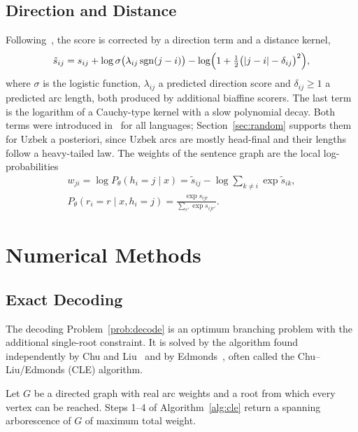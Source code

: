\documentclass[mathematics,article,submit,pdftex,oneauthor]{Definitions/mdpi}
\begin{document}
\subsection{Direction and Distance}
Following~\cite{Qi2018}, the score is corrected by a direction term and a distance kernel,
\begin{equation}\label{eq:corrected}
\tilde s_{ij}=s_{ij}+\log\sigma\bigl(\lambda_{ij}\,\mathrm{sgn}(j-i)\bigr)-\log\Bigl(1+\tfrac12\bigl(|j-i|-\delta_{ij}\bigr)^2\Bigr),
\end{equation}
where $\sigma$ is the logistic function, $\lambda_{ij}$ a predicted direction score and $\delta_{ij}\geqslant1$ a predicted arc length, both produced by additional biaffine scorers.
The last term is the logarithm of a Cauchy-type kernel with a slow polynomial decay.
Both terms were introduced in~\cite{Qi2018} for all languages; Section~\ref{sec:random} supports them for Uzbek a posteriori, since Uzbek arcs are mostly head-final and their lengths follow a heavy-tailed law.
The weights of the sentence graph are the local log-probabilities
\begin{equation}\label{eq:weights}
\begin{gathered}
w_{ji}=\log P_\theta(h_i=j\mid x)=\tilde s_{ij}-\log\sum_{k\neq i}\exp\tilde s_{ik},\\
P_\theta(r_i=r\mid x,h_i=j)=\frac{\exp s_{ijr}}{\sum_{r'}\exp s_{ijr'}}.
\end{gathered}
\end{equation}

\section{Numerical Methods}\label{sec:numerical}

\subsection{Exact Decoding}
The decoding Problem~\ref{prob:decode} is an optimum branching problem with the additional single-root constraint.
It is solved by the algorithm found independently by Chu and Liu~\cite{ChuLiu1965} and by Edmonds~\cite{Edmonds1967}, often called the Chu--Liu/Edmonds (CLE) algorithm.

\begin{Theorem}\label{thm:cle}
Let $G$ be a directed graph with real arc weights and a root from which every vertex can be reached.
Steps 1--4 of Algorithm~\ref{alg:cle} return a spanning arborescence of $G$ of maximum total weight.
\end{Theorem}
\end{document}

